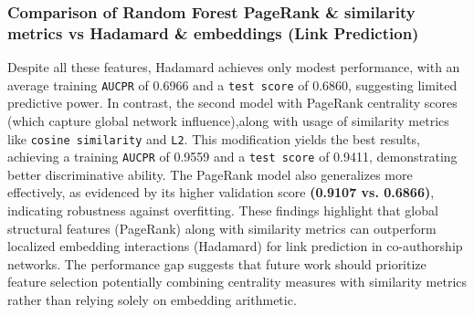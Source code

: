 \documentclass[conference]{IEEEtran}
\begin{document}
\subsubsection{\textbf{Comparison of Random Forest PageRank \& similarity metrics vs Hadamard \& embeddings (Link Prediction)}} 
Despite all these features, Hadamard achieves only modest performance, with an average training \texttt{AUCPR} of 0.6966 and a \texttt{test score} of 0.6860, suggesting limited predictive power. In contrast, the second model with PageRank centrality scores (which capture global network influence),along with usage of similarity metrics like \texttt{cosine similarity} and \texttt{L2}. This modification yields the best results, achieving a training \texttt{AUCPR} of 0.9559 and a \texttt{test score} of 0.9411, demonstrating better discriminative ability. The PageRank model also generalizes more effectively, as evidenced by its higher validation score \textbf{(0.9107 vs. 0.6866)}, indicating robustness against overfitting. These findings highlight that global structural features (PageRank) along with similarity metrics can outperform localized embedding interactions (Hadamard) for link prediction in co-authorship networks. The performance gap suggests that future work should prioritize feature selection potentially combining centrality measures with similarity metrics rather than relying solely on embedding arithmetic. 
\end{document}
